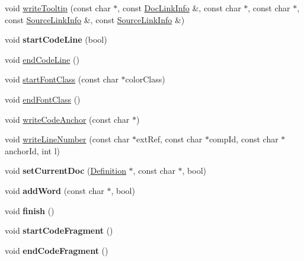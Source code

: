 \begin{DoxyCompactItemize}
void \mbox{\hyperlink{class_docbook_code_generator_a5ce309cd68be3ce9eabbd2e522c1c286}{write\+Tooltip}} (const char $\ast$, const \mbox{\hyperlink{struct_doc_link_info}{Doc\+Link\+Info}} \&, const char $\ast$, const char $\ast$, const \mbox{\hyperlink{struct_source_link_info}{Source\+Link\+Info}} \&, const \mbox{\hyperlink{struct_source_link_info}{Source\+Link\+Info}} \&)
\item 
\mbox{\label{class_docbook_code_generator_aa6af9297cbb2be8c975d0d123cf6d3b1}} 
void {\bfseries start\+Code\+Line} (bool)
\item 
void \mbox{\hyperlink{class_docbook_code_generator_ab457dd3ab8b99073d9d2cc6f566bb712}{end\+Code\+Line}} ()
\item 
void \mbox{\hyperlink{class_docbook_code_generator_ab39e3a862244d1c8926895d69240ca0d}{start\+Font\+Class}} (const char $\ast$color\+Class)
\item 
void \mbox{\hyperlink{class_docbook_code_generator_a06537ef3f7d9c2cb4b9b0293f43d9151}{end\+Font\+Class}} ()
\item 
void \mbox{\hyperlink{class_docbook_code_generator_ac0f7f4cd4fec98da2855978adf786a04}{write\+Code\+Anchor}} (const char $\ast$)
\item 
void \mbox{\hyperlink{class_docbook_code_generator_a0230dcc0e6ee8d3323571df44c5178ba}{write\+Line\+Number}} (const char $\ast$ext\+Ref, const char $\ast$comp\+Id, const char $\ast$anchor\+Id, int l)
\item 
\mbox{\label{class_docbook_code_generator_a22d996b1a717f7b76904cb63a21d1de2}} 
void {\bfseries set\+Current\+Doc} (\mbox{\hyperlink{class_definition}{Definition}} $\ast$, const char $\ast$, bool)
\item 
\mbox{\label{class_docbook_code_generator_ad935ade67aa122c6a67120d6e401ea78}} 
void {\bfseries add\+Word} (const char $\ast$, bool)
\item 
\mbox{\label{class_docbook_code_generator_ab587badbb22f04c80d79fd6bf0b69b9a}} 
void {\bfseries finish} ()
\item 
\mbox{\label{class_docbook_code_generator_ab3defbd26a85fda9fd017b4bdde4bcf3}} 
void {\bfseries start\+Code\+Fragment} ()
\item 
\mbox{\label{class_docbook_code_generator_a9295ab1e01fbe2f269105be783a9fc6b}} 
void {\bfseries end\+Code\+Fragment} ()
\end{DoxyCompactItemize}



